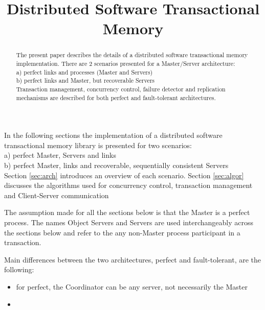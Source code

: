 \documentclass[times, 10pt,twocolumn]{article}
\begin{document}
\title{Distributed Software Transactional Memory}

\maketitle
\thispagestyle{empty}

\begin{abstract}


   The present paper describes the details of a distributed software
   transactional memory implementation.
   There are 2 scenarios presented for a Master/Server architecture: \\
   a) perfect links and processes (Master and Servers) \\
   b) perfect links and Master, but recoverable Servers \\

   Transaction management, concurrency control, failure detector and 
   replication mechanisms are described for both perfect and fault-tolerant
   architectures.
   
\end{abstract}



In the following sections the implementation of a distributed software 
transactional memory library is presented for two scenarios:\\
a) perfect Master, Servers and links\\
b) perfect Master, links and recoverable, sequentially consistent Servers\\

Section \ref{sec:arch} introduces an overview of each scenario. Section 
\ref{sec:algor} discusses the algorithms used for concurrency control, 
transaction management and Client-Server communication


\label{sec:arch}

The assumption made for all the sections below is that the Master is a perfect process. The names Object Servers and Servers are used interchangeably across the sections below and refer to the any non-Master process participant in a transaction.

Main differences between the two architectures, perfect and fault-tolerant, are the following:
\begin{itemize}[noitemsep,nolistsep]
\item for perfect, the Coordinator can be any server, not necessarily the Master
\item 
\end{itemize}
\end{document}

